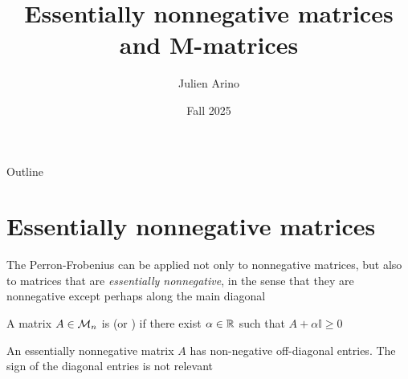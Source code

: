 \documentclass[aspectratio=169]{beamer}
\title{Essentially nonnegative matrices and M-matrices}
\author{Julien Arino}
\date{Fall 2025}
\begin{document}
\begin{frame}
	\titlepage
\end{frame}
\addtocounter{page}{-1}
  
  
\begin{frame}{Outline}
	  \tableofcontents[hideallsubsections]
\end{frame}
\addtocounter{page}{-1}


\section{Essentially nonnegative matrices}

\begin{frame}
The Perron-Frobenius can be applied not only to nonnegative matrices, but also to matrices that are \emph{essentially nonnegative}, in the sense that they are nonnegative except perhaps along the main diagonal
\vfill
\begin{definition}
A matrix $A\in \mathcal{M}_n$ is  (or ) if there exist $\alpha \in \mathbb{R}$ such that $A+\alpha \mathbb{I}\geq 0$
\end{definition}
\vfill
\begin{remark}
    An essentially nonnegative matrix $A$ has non-negative off-diagonal entries. The sign of the diagonal entries is not relevant
\end{remark}
\end{frame}
\end{document}
